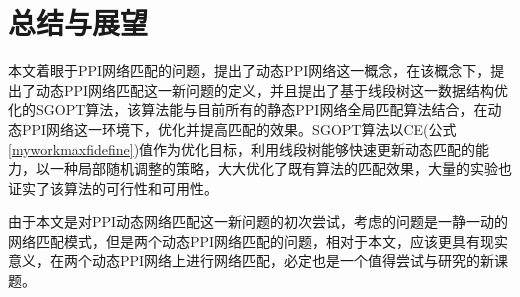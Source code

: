 \chapter{总结与展望}

本文着眼于PPI网络匹配的问题，提出了动态PPI网络这一概念，在该概念下，提出了动态PPI网络匹配这一新问题的定义，并且提出了基于线段树这一数据结构优化的SGOPT算法，该算法能与目前所有的静态PPI网络全局匹配算法结合，在动态PPI网络这一环境下，优化并提高匹配的效果。SGOPT算法以CE(公式\ref{myworkmaxfidefine})值作为优化目标，利用线段树能够快速更新动态匹配的能力，以一种局部随机调整的策略，大大优化了既有算法的匹配效果，大量的实验也证实了该算法的可行性和可用性。

由于本文是对PPI动态网络匹配这一新问题的初次尝试，考虑的问题是一静一动的网络匹配模式，但是两个动态PPI网络匹配的问题，相对于本文，应该更具有现实意义，在两个动态PPI网络上进行网络匹配，必定也是一个值得尝试与研究的新课题。
